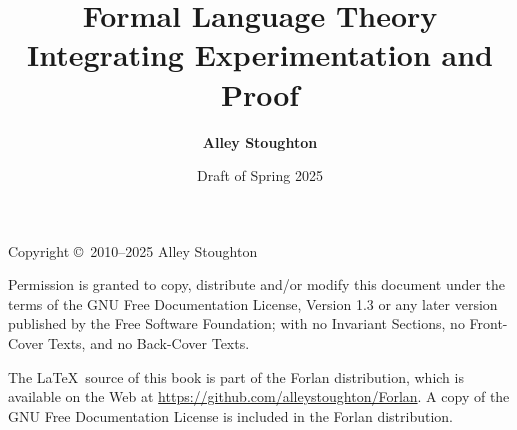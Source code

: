 \documentclass[11pt,twoside]{book}
\begin{document}

\title{\Huge\bf Formal Language Theory\\[.3cm]
\LARGE\bf Integrating Experimentation and Proof}

\author{\LARGE\bf Alley Stoughton}

\date{Draft of Spring 2025}

\titlepic{}

\maketitle

\thispagestyle{empty}

\noindent Copyright \copyright\ 2010--2025 Alley Stoughton

\vspace{.5cm}
\noindent
Permission is granted to copy, distribute and/or modify this document
under the terms of the GNU Free Documentation License, Version 1.3 or
any later version published by the Free Software Foundation; with no
Invariant Sections, no Front-Cover Texts, and no Back-Cover Texts.

The \LaTeX\ source of this book is part of the Forlan distribution,
which is available on the Web at
\url{https://github.com/alleystoughton/Forlan}.  A copy of the GNU
Free Documentation License is included in the Forlan distribution.

\clearemptydoublepage

\tableofcontents

\clearemptydoublepage

\listoffigures

\clearemptydoublepage






\clearemptydoublepage



\clearemptydoublepage



\clearemptydoublepage



\clearemptydoublepage



\clearemptydoublepage



\clearemptydoublepage







\clearemptydoublepage

{\small
\printindex}
\end{document}
